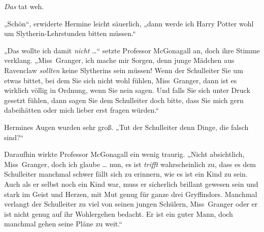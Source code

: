 \emph{Das} tat weh.

„Schön“, erwiderte Hermine leicht säuerlich, „dann werde ich Harry Potter wohl um Slytherin-Lehrstunden bitten müssen.“

„Das wollte ich damit \emph{nicht} …“ setzte Professor McGonagall an, doch ihre Stimme verklang.
„Miss~Granger, ich mache mir Sorgen, denn junge Mädchen aus Ravenclaw \emph{sollten} keine Slytherins sein müssen! Wenn der Schulleiter Sie um etwas bittet, bei dem Sie sich nicht wohl fühlen, Miss~Granger, dann ist es wirklich völlig in Ordnung, wenn Sie nein sagen. Und falls Sie sich unter Druck gesetzt fühlen, dann sagen Sie dem Schulleiter doch bitte, dass Sie mich gern dabeihätten oder mich lieber erst fragen würden.“

Hermines Augen wurden sehr groß.
„Tut der Schulleiter denn Dinge, die falsch sind?“

Daraufhin wirkte Professor McGonagall ein wenig traurig.
„Nicht absichtlich, Miss~Granger, doch ich glaube … nun, es ist \emph{trifft} wahrscheinlich zu, dass es dem Schulleiter manchmal schwer fällt sich zu erinnern, wie es ist ein Kind zu sein. Auch als er selbst noch ein Kind war, muss er sicherlich brillant gewesen sein und stark im Geist und Herzen, mit Mut genug für ganze drei Gryffindors. Manchmal verlangt der Schulleiter zu viel von seinen jungen Schülern, Miss~Granger oder er ist nicht genug auf ihr Wohlergehen bedacht. Er ist ein guter Mann, doch manchmal gehen seine Pläne zu weit.“

